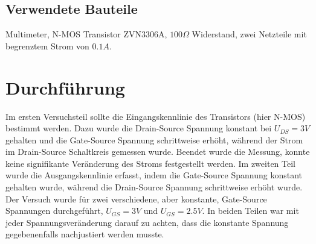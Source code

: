 \documentclass[11pt, a4paper]{article}
\begin{document}
\subsection*{Verwendete Bauteile}
Multimeter, N-MOS Transistor ZVN3306A, $100 \Omega$ Widerstand, zwei Netzteile mit begrenztem Strom von $0.1 A$.
\section*{Durchführung}
Im ersten Versuchsteil sollte die Eingangskennlinie des Transistors (hier N-MOS) bestimmt werden. Dazu wurde die Drain-Source Spannung konstant bei $U_{DS} = 3 V$ gehalten und die Gate-Source Spannung schrittweise erhöht, während der Strom im Drain-Source Schaltkreis gemessen wurde. Beendet wurde die Messung, konnte keine signifikante Veränderung des Stroms festgestellt werden.
Im zweiten Teil wurde die Ausgangskennlinie erfasst, indem die Gate-Source Spannung konstant gehalten wurde, während die Drain-Source Spannung schrittweise erhöht wurde. Der Versuch wurde für zwei verschiedene, aber konstante, Gate-Source Spannungen durchgeführt, $U_{GS} = 3 V$ und $U_{GS} = 2.5 V$.
In beiden Teilen war mit jeder Spannungsveränderung darauf zu achten, dass die konstante Spannung gegebenenfalls nachjustiert werden musste.
\end{document}
